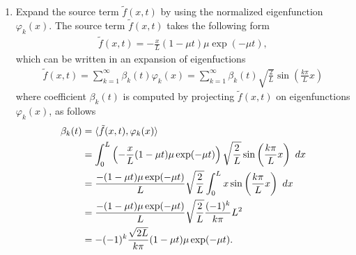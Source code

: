 \documentclass[12pt]{article}
\begin{document}
\begin{enumerate}
	\item Expand the source term $\tilde{f}(x,t)$ by using the normalized eigenfunction $\varphi_{k}(x)$.
	      The source term $\tilde{f}(x,t)$ takes the following form
	      \begin{align}
		      \tilde{f}(x,t) = -\frac{x}{L} (1-\mu t)\mu \exp(-\mu t),
	      \end{align}
	      which can be written in an expansion of eigenfuctions
	      \begin{align}
		      \label{eq:ftilde}
		      \boxed{
			      \tilde{f}(x,t)
			      = \sum_{k=1}^\infty \beta_k(t) \varphi_{k}(x)
			      = \sum_{k=1}^\infty \beta_k(t) \sqrt{\frac{2}{L}} \sin\left( \frac{k \pi}{L} x \right)
		      }
	      \end{align}
	      where coefficient $\beta_{k}(t)$ is computed by projecting $\tilde{f}(x,t)$ on eigenfunctions $\varphi_{k}(x)$, 
	      as follows
	      \begin{align}
		      \label{eq:betacoefficient}
		      \beta_k(t)
		       & = \langle \tilde{f}(x,t),\varphi_{k}(x) \rangle             \notag \\
		       & = \int_0^L 
		      \left(-\frac{x}{L} (1-\mu t)\mu \exp(-\mu t) \right)
		      \sqrt{\frac{2}{L}} \sin\left(\frac{k \pi}{L} x\right) \ dx     \notag \\
		       & = \frac{-(1-\mu t) \mu \exp(-\mu t)}{L} \sqrt{\frac{2}{L}}
		      \int_0^L x
		      \sin\left(\frac{k \pi}{L} x\right) \ dx                        \notag \\  
		       & = \frac{-(1-\mu t) \mu \exp(-\mu t)}{L} \sqrt{\frac{2}{L}}
		      \frac{(-1)^k}{k\pi}L^2                                         \notag \\
		       & = -(-1)^k \frac{\sqrt{2L}}{k \pi}(1-\mu t)\mu \exp(-\mu t).
	      \end{align}
	      

\end{enumerate}
\end{document}
